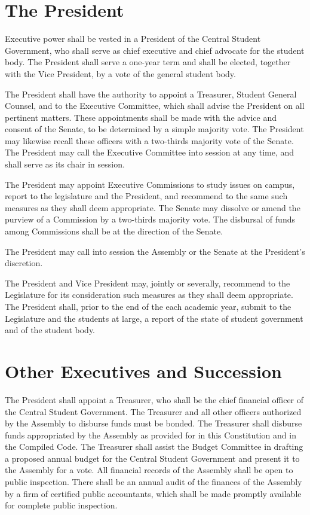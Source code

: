 
\section{The President}
    Executive power shall be vested in a President of the Central Student Government, who shall serve as chief executive and chief advocate for the student body. The President shall serve a one-year term and shall be elected, together with the Vice President, by a vote of the general student body.

    The President shall have the authority to appoint a Treasurer, Student General Counsel, and  to the Executive Committee, which shall advise the President on all pertinent matters. These appointments shall be made with the advice and consent of the Senate, to be determined by a simple majority vote. The President may likewise recall these officers with a two-thirds majority vote of the Senate. The President may call the Executive Committee into session at any time, and shall serve as its chair in session. 
    
    The President may appoint Executive Commissions to study issues on campus, report to the legislature and the President, and recommend to the same such measures as they shall deem appropriate. The Senate may dissolve or amend the purview of a Commission by a two-thirds majority vote. The disbursal of funds among Commissions shall be at the direction of the Senate.

    The President may call into session the Assembly or the Senate at the President's discretion.

    The President and Vice President may, jointly or severally, recommend to the Legislature for its consideration such measures as they shall deem appropriate. The President shall, prior to the end of the each academic year, submit to the Legislature and the students at large, a report of the state of student government and of the student body.

\section{Other Executives and Succession}
   The President shall appoint a Treasurer, who shall be the chief financial officer of the Central Student Government. The Treasurer and all other officers authorized by the Assembly to disburse funds must be bonded. The Treasurer shall disburse funds appropriated by the Assembly as provided for in this Constitution and in the Compiled Code. The Treasurer shall assist the Budget Committee in drafting a proposed annual budget for the Central Student Government and present it to the Assembly for a vote. All financial records of the Assembly shall be open to public inspection. There shall be an annual audit of the finances of the Assembly by a firm of certified public accountants, which shall be made promptly available for complete public inspection.

